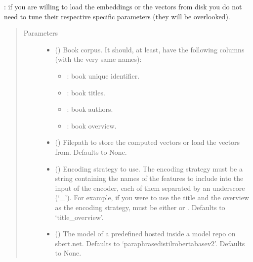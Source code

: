 \documentclass[letterpaper,10pt,english]{sphinxmanual}
\begin{document}
\begin{fulllineitems}
\begin{fulllineitems}
: if you are willing to load the embeddings or the vectors
from disk you do not need to tune their respective specific parameters 
(they will be overlooked).
\begin{quote}\begin{description}
\item[{Parameters}] \leavevmode\begin{itemize}
\item {} 
 () \textendash{} 
Book corpus. It should, at least, have the following columns        
(with the very same names):
\begin{itemize}
\item {} 
: book unique identifier.

\item {} 
: book titles.

\item {} 
: book authors.

\item {} 
: book overview.

\end{itemize}


\item {} 
 (\sphinxstyleliteralemphasis{\sphinxupquote{, }}) \textendash{} Filepath to store the computed vectors
or load the vectors from. Defaults to None.

\item {} 
 (\sphinxstyleliteralemphasis{\sphinxupquote{, }}) \textendash{} Encoding strategy to use. The encoding strategy
must be a string containing the names of the features to include into
the input of the encoder, each of them separated by an underscore (‘\_’).
For example, if you were to use the title and the overview as the encoding        
strategy,  must be either  or .
Defaults to ‘title\_overview’.

\item {} 
 (\sphinxstyleliteralemphasis{\sphinxupquote{, }}) \textendash{} The model  of a predefined
 hosted inside a model repo on sbert.net. Defaults
to ‘paraphrase\sphinxhyphen{}distilroberta\sphinxhyphen{}base\sphinxhyphen{}v2’. Defaults to None.


\end{itemize}
\end{description}
\end{quote}
\end{fulllineitems}
\end{fulllineitems}
\end{document}
